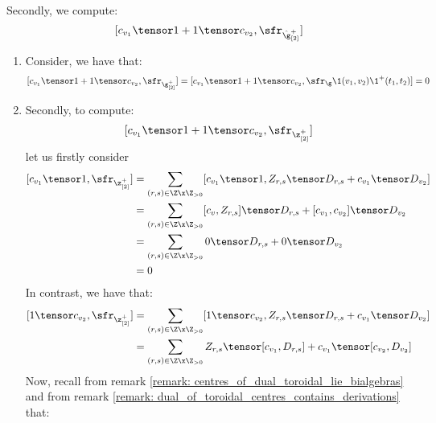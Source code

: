 Secondly, we compute:
                            $$[c_{v_1} \tensor 1 + 1 \tensor c_{v_2}, \sfr_{\hat{\g}_{[2]}^+}]$$
                        \begin{enumerate}
                            \item Consider, we have that:
                                $$[c_{v_1} \tensor 1 + 1 \tensor c_{v_2}, \sfr_{\g_{[2]}^+}] = [c_{v_1} \tensor 1 + 1 \tensor c_{v_2}, \sfr_{\g} \1(v_1, v_2) \1^+(t_1, t_2)] = 0$$
                            \item Secondly, to compute:
                                $$[c_{v_1} \tensor 1 + 1 \tensor c_{v_2}, \sfr_{\z_{[2]}^+}]$$
                            let us firstly consider 
                                $$
                                    \begin{aligned}
                                         [c_{v_1} \tensor 1, \sfr_{\z_{[2]}^+}] & = \sum_{(r, s) \in \Z \x \Z_{> 0}} [c_{v_1} \tensor 1, Z_{r, s} \tensor D_{r, s} + c_{v_1} \tensor D_{v_2}]
                                         \\
                                         & = \sum_{(r, s) \in \Z \x \Z_{> 0}} [c_v, Z_{r, s}] \tensor D_{r, s} + [c_{v_1}, c_{v_2}] \tensor D_{v_2}
                                         \\
                                         & = \sum_{(r, s) \in \Z \x \Z_{> 0}} 0 \tensor D_{r, s} + 0 \tensor D_{v_2}
                                         \\
                                         & = 0
                                    \end{aligned}
                                $$
                            In contrast, we have that:
                                $$
                                    \begin{aligned}
                                         [1 \tensor c_{v_2}, \sfr_{\z_{[2]}^+}] & = \sum_{(r, s) \in \Z \x \Z_{> 0}} [1 \tensor c_{v_2}, Z_{r, s} \tensor D_{r, s} + c_{v_1} \tensor D_{v_2}]
                                         \\
                                         & = \sum_{(r, s) \in \Z \x \Z_{> 0}} Z_{r, s} \tensor [c_{v_1}, D_{r, s}] + c_{v_1} \tensor [c_{v_2}, D_{v_2}]
                                    \end{aligned}
                                $$
                            Now, recall from remark \ref{remark: centres_of_dual_toroidal_lie_bialgebras} and from remark \ref{remark: dual_of_toroidal_centres_contains_derivations} that:

\end{enumerate}
